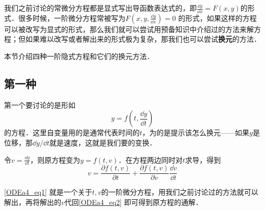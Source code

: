 

我们之前讨论的常微分方程都是显式写出导函数表达式的，即$\frac{\dd y}{\dd x}=F(x, y)$的形式．很多时候，一阶微分方程常被写为$F(x, y, \frac{\dd y}{\dd x})=0$ 的形式，如果这样的方程可以被改写为显式的形式，那么我们就可以尝试用预备知识中介绍过的方法来解方程；但如果难以改写或者解出来的形式极为复杂，那我们也可以尝试\textbf{换元}的方法．

本节介绍四种一阶隐式方程和它们的换元方法．

\subsection{第一种}

第一个要讨论的是形如
\begin{equation}\label{ODEa4_eq2}
y=f(t, \frac{\dd y}{\dd t})
\end{equation}
的方程．这里自变量用的是通常代表时间的$t$，为的是提示该怎么换元——如果$y$是位移，那$\dd y/\dd t$就是速度，这就是我们要的变换．

令$v=\frac{\dd y}{\dd t}$，则原方程变为$y=f(t, v)$．在方程两边同时对$t$求导，得到
\begin{equation}\label{ODEa4_eq1}
v=\frac{\partial f(t, v)}{\partial t}+\frac{\partial f(t, v)}{\partial v}\frac{\dd v}{\dd t}
\end{equation}

\autoref{ODEa4_eq1} 就是一个关于$t, v$的一阶微分方程，用我们之前讨论过的方法就可以解出，再将解出的$v$代回\autoref{ODEa4_eq2} 即可得到原方程的通解．

